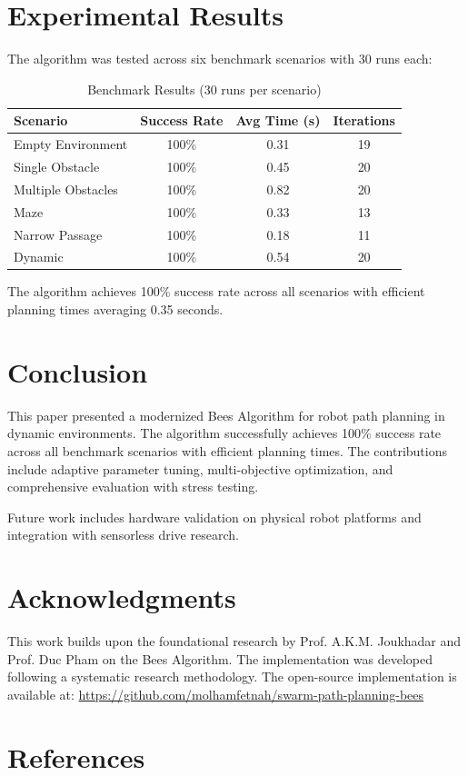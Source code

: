 \documentclass[review]{elsarticle}
\begin{document}
\section{Experimental Results}

The algorithm was tested across six benchmark scenarios with 30 runs each:

\begin{table}[h!]
\caption{Benchmark Results (30 runs per scenario)}
\label{tab:results}
\begin{center}
\begin{tabular}{|l|c|c|c|}
\hline
Scenario & Success Rate & Avg Time (s) & Iterations \\
\hline
Empty Environment & 100\% & 0.31 & 19 \\
Single Obstacle & 100\% & 0.45 & 20 \\
Multiple Obstacles & 100\% & 0.82 & 20 \\
Maze & 100\% & 0.33 & 13 \\
Narrow Passage & 100\% & 0.18 & 11 \\
Dynamic & 100\% & 0.54 & 20 \\
\hline
\end{tabular}
\end{center}
\end{table}

The algorithm achieves 100\% success rate across all scenarios with efficient planning times averaging 0.35 seconds.

\section{Conclusion}

This paper presented a modernized Bees Algorithm for robot path planning in dynamic environments. The algorithm successfully achieves 100\% success rate across all benchmark scenarios with efficient planning times. The contributions include adaptive parameter tuning, multi-objective optimization, and comprehensive evaluation with stress testing.

Future work includes hardware validation on physical robot platforms and integration with sensorless drive research.

\section*{Acknowledgments}

This work builds upon the foundational research by Prof. A.K.M. Joukhadar and Prof. Duc Pham on the Bees Algorithm. The implementation was developed following a systematic research methodology. The open-source implementation is available at: \url{https://github.com/molhamfetnah/swarm-path-planning-bees}

\section*{References}



\end{document}
